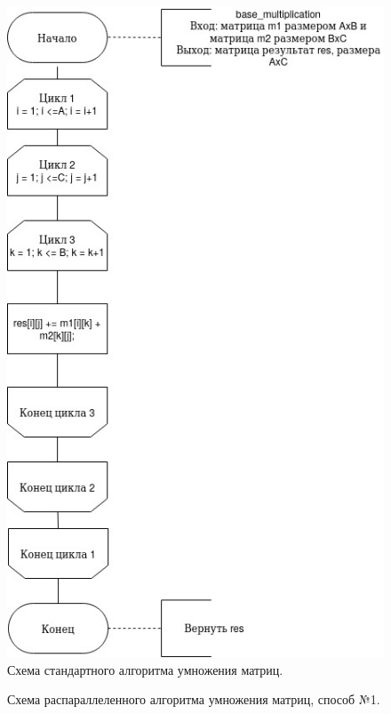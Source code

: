 \documentclass[12pt]{report}
\begin{document}
\begin{figure}[h]
	\centering
	\includegraphics[width=1\linewidth]{base.jpg}
	\caption{Схема стандартного алгоритма умножения матриц.}
	\label{fig:mpr}
\end{figure}

\begin{figure}[h]
	\centering
	\caption{Схема распараллеленного алгоритма умножения матриц, способ №1.}
	\label{fig:mpr}
\end{figure}
\end{document}
